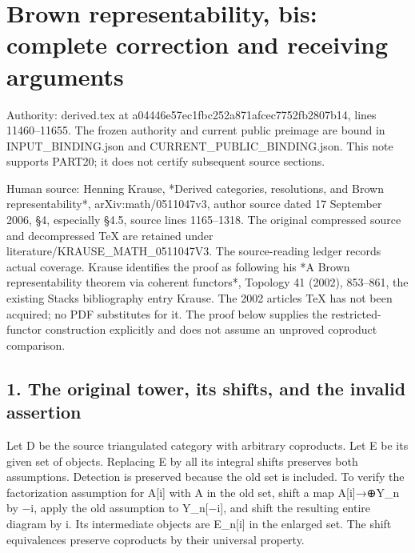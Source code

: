 \section{\texorpdfstring{Brown representability,\allowbreak{} bis:\allowbreak{} complete correction and receiving arguments}{Brown   complete correction and receiving arguments}}\label{proofs-11460-11655-brown-representability-bis-complete-correction-and-receiving-arguments}

Authority:\allowbreak{} derived.tex at a04446e5\allowbreak{}7ec1fbc2\allowbreak{}52a871af\allowbreak{}cec7752f\allowbreak{}b2807b14, lines 11460–\allowbreak{}11655. The frozen authority and current public preimage are bound in INPUT\_\allowbreak{}BINDING.json and CURRENT\_\allowbreak{}PUBLIC\_\allowbreak{}BINDING.json. This note supports PART20; it does not certify subsequent source sections.

Human source:\allowbreak{} Henning Krause,\allowbreak{} *Derived categories,\allowbreak{} resolutions,\allowbreak{} and Brown representability*,\allowbreak{} arXiv:\allowbreak{}math/\allowbreak{}0511047v3,\allowbreak{} author source dated 17 September 2006,\allowbreak{} §4,\allowbreak{} especially §4.5,\allowbreak{} source lines 1165–\allowbreak{}1318. The original compressed source and decompressed TeX are retained under literature/\allowbreak{}KRAUSE\_\allowbreak{}MATH\_\allowbreak{}0511047V3. The source-reading ledger records actual coverage. Krause identifies the proof as following his *A Brown representability theorem via coherent functors*,\allowbreak{} Topology 41 (2002)\allowbreak{},\allowbreak{} 853–\allowbreak{}861,\allowbreak{} the existing Stacks bibliography entry Krause. The 2002 article\textquotesingle s TeX has not been acquired; no PDF substitutes for it. The proof below supplies the restricted-functor construction explicitly and does not assume an unproved coproduct comparison.

\subsection{\texorpdfstring{1. The original tower,\allowbreak{} its shifts,\allowbreak{} and the invalid assertion}{1. The original  its  and the invalid assertion}}\label{proofs-11460-11655-the-original-tower-its-shifts-and-the-invalid-assertion}

Let D be the source triangulated category with arbitrary coproducts. Let E be its given set of objects. Replacing E by all its integral shifts preserves both assumptions. Detection is preserved because the old set is included. To verify the factorization assumption for A[i]\allowbreak{} with A in the old set,\allowbreak{} shift a map A[i]\allowbreak{}\allowbreak{}→\allowbreak{}⊕Y\_\allowbreak{}n by −i,\allowbreak{} apply the old assumption to Y\_\allowbreak{}n[−i]\allowbreak{},\allowbreak{} and shift the resulting entire diagram by i. Its intermediate objects are E\_\allowbreak{}n[i]\allowbreak{} in the enlarged set. The shift equivalences preserve coproducts by their universal property.

